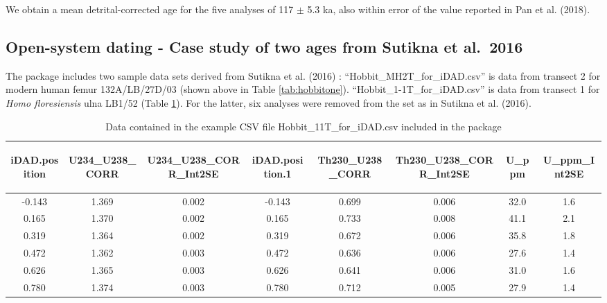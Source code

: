 \documentclass[]{elsarticle} %
\begin{document}
We obtain a mean detrital-corrected age for the five analyses of 117 \(\pm\) 5.3 ka, also within error of the value reported in Pan et al. (2018).

\hypertarget{open-system-dating---case-study-of-two-ages-from-sutikna-et-al.-2016}{%
\subsection{Open-system dating - Case study of two ages from Sutikna et al.~2016}\label{open-system-dating---case-study-of-two-ages-from-sutikna-et-al.-2016}}

The package includes two sample data sets derived from Sutikna et al. (2016) : ``Hobbit\_MH2T\_for\_iDAD.csv'' is data from transect 2 for modern human femur 132A/LB/27D/03 (shown above in Table \ref{tab:hobbitone}). ``Hobbit\_1-1T\_for\_iDAD.csv'' is data from transect 1 for \emph{Homo floresiensis} ulna LB1/52 (Table \ref{tab:table-human}). For the latter, six analyses were removed from the set as in Sutikna et al. (2016).

\begin{table}[ht]
\centering
\begin{tabular}{cccccccc}
  \hline
\begin{sideways} iDAD.position \end{sideways} & \begin{sideways} U234\_U238\_CORR \end{sideways} & \begin{sideways} U234\_U238\_CORR\_Int2SE \end{sideways} & \begin{sideways} iDAD.position.1 \end{sideways} & \begin{sideways} Th230\_U238\_CORR \end{sideways} & \begin{sideways} Th230\_U238\_CORR\_Int2SE \end{sideways} & \begin{sideways} U\_ppm \end{sideways} & \begin{sideways} U\_ppm\_Int2SE \end{sideways} \\ 
  \hline
-0.143 & 1.369 & 0.002 & -0.143 & 0.699 & 0.006 & 32.0 & 1.6 \\ 
  0.165 & 1.370 & 0.002 & 0.165 & 0.733 & 0.008 & 41.1 & 2.1 \\ 
  0.319 & 1.364 & 0.002 & 0.319 & 0.672 & 0.006 & 35.8 & 1.8 \\ 
  0.472 & 1.362 & 0.003 & 0.472 & 0.636 & 0.006 & 27.6 & 1.4 \\ 
  0.626 & 1.365 & 0.003 & 0.626 & 0.641 & 0.006 & 31.0 & 1.6 \\ 
  0.780 & 1.374 & 0.003 & 0.780 & 0.712 & 0.005 & 27.9 & 1.4 \\ 
   \hline
\end{tabular}
\caption{\label{tab:table-human}Data contained in the example CSV file Hobbit\_1\-1T\_for\_iDAD.csv included in the package} 
\end{table}
\end{document}
